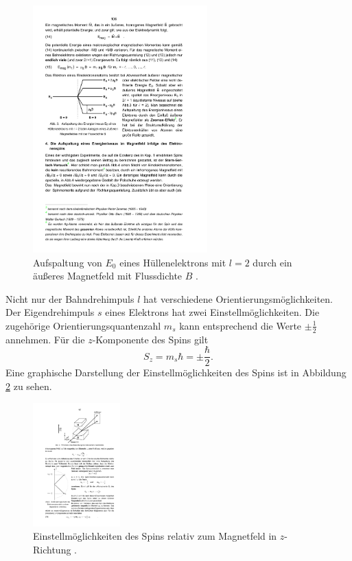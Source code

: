 \begin{figure}
	\centering
  \includegraphics[width=0.6\textwidth] {bilder/aufspaltung.pdf}
	\caption{Aufspaltung von $E_0$ eines Hüllenelektrons mit $l=2$ durch ein äußeres Magnetfeld mit Flussdichte $B$ \cite{anleitung28}.}
	\label{fig:aufspaltung}
\end{figure}

Nicht nur der Bahndrehimpuls $l$ hat verschiedene Orientierungsmöglichkeiten. Der Eigendrehimpuls $s$ eines Elektrons hat zwei Einstellmöglichkeiten. Die zugehörige Orientierungsquantenzahl $m_s$ kann entsprechend die Werte $\pm\frac{1}{2}$ annehmen. Für die $z$-Komponente des Spins gilt
\begin{equation}
  S_z = m_s\hbar = \pm \frac{\hbar}{2}.
\end{equation}
Eine graphische Darstellung der Einstellmöglichkeiten des Spins ist in Abbildung \ref{fig:spin} zu sehen.
\begin{figure}
	\centering
  \includegraphics[width=0.3\textwidth] {bilder/spin.pdf}
	\caption{Einstellmöglichkeiten des Spins relativ zum Magnetfeld in $z$-Richtung \cite{anleitung28}.}
	\label{fig:spin}
\end{figure}

